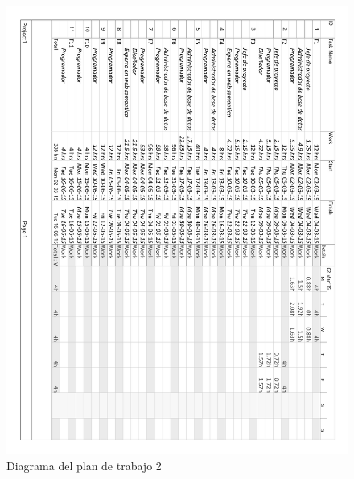 \begin{figure}[!htp]
	\centering
	\includegraphics[page=2, scale=.8]{fig/real_work_plan_diagram}
	\caption{Diagrama del plan de trabajo 2}
\end{figure}

